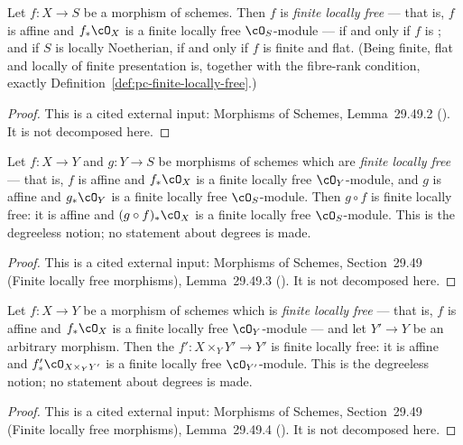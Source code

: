 \begin{lemma}
\label{lem:pc-finite-flat-fp-locally-free}
Let $f:X\to S$ be a morphism of schemes.  Then $f$ is \emph{finite
locally free} --- that is, $f$ is affine and $f_*\cO_X$ is a finite
locally free $\cO_S$-module --- if and only if $f$ is
; and if $S$ is locally Noetherian, if and only if
$f$ is finite and flat.  (Being finite, flat and locally of finite
presentation is, together with the fibre-rank condition, exactly
Definition~\ref{def:pc-finite-locally-free}.)
\end{lemma}
\begin{proof}
This is a cited external input: Morphisms of Schemes, Lemma~29.49.2
().  It is not
decomposed here.
\end{proof}

\begin{lemma}
\label{lem:pc-flf-composition}
Let $f:X\to Y$ and $g:Y\to S$ be morphisms of schemes which are
\emph{finite locally free} --- that is, $f$ is affine and $f_*\cO_X$ is a
finite locally free $\cO_Y$-module, and $g$ is affine and $g_*\cO_Y$ is a
finite locally free $\cO_S$-module.  Then $g\circ f$ is finite locally
free: it is affine and $(g\circ f)_*\cO_X$ is a finite locally free
$\cO_S$-module.  This is the degreeless notion; no statement about
degrees is made.
\end{lemma}
\begin{proof}
This is a cited external input: Morphisms of Schemes, Section~29.49
(Finite locally free morphisms), Lemma~29.49.3
().  It is not decomposed here.
\end{proof}

\begin{lemma}
\label{lem:pc-flf-base-change}
Let $f:X\to Y$ be a morphism of schemes which is \emph{finite locally
free} --- that is, $f$ is affine and $f_*\cO_X$ is a finite locally free
$\cO_Y$-module --- and let $Y'\to Y$ be an arbitrary morphism.  Then the
 $f':X\times_YY'\to Y'$ is
finite locally free: it is affine and $f'_*\cO_{X\times_YY'}$ is a finite
locally free $\cO_{Y'}$-module.  This is the degreeless notion; no
statement about degrees is made.
\end{lemma}
\begin{proof}
This is a cited external input: Morphisms of Schemes, Section~29.49
(Finite locally free morphisms), Lemma~29.49.4
().  It is not decomposed here.
\end{proof}

